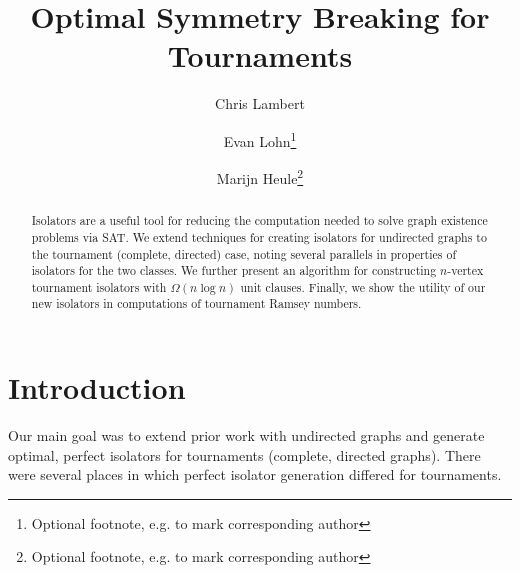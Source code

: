 \documentclass[a4paper,UKenglish,cleveref, autoref, thm-restate]{lipics-v2021}
\title{Optimal Symmetry Breaking for Tournaments}
\author{Chris Lambert}{Dummy University Computing Laboratory, [optional: Address], Country \and My second affiliation, Country \and \url{http://www.myhomepage.edu} }{johnqpublic@dummyuni.org}{}{(Optional) author-specific funding acknowledgements}%
\author{Evan Lohn\footnote{Optional footnote, e.g. to mark corresponding author}}{Department of Informatics, Dummy College, [optional: Address], Country}{joanrpublic@dummycollege.org}{}{[funding]}
\author{Marijn Heule\footnote{Optional footnote, e.g. to mark corresponding author}}{Department of Informatics, Dummy College, [optional: Address], Country}{joanrpublic@dummycollege.org}{}{[funding]}
\begin{document}
\maketitle

%
\begin{abstract}

Isolators are a useful tool for reducing the computation needed to solve graph existence problems via SAT.  We extend techniques for creating isolators for undirected graphs to the tournament (complete, directed) case, noting several parallels in properties of isolators for the two classes. We further present an algorithm for constructing $n$-vertex tournament isolators with $\Omega(n \log n)$ unit clauses. Finally, we show the utility of our new isolators in computations of tournament Ramsey numbers.

\end{abstract}
%
%



\section{Introduction}
Our main goal was to extend prior work \cite{ref_heule} with undirected graphs and generate optimal, perfect isolators for tournaments (complete, directed graphs). There were several places in which perfect isolator generation differed for tournaments.
\end{document}
